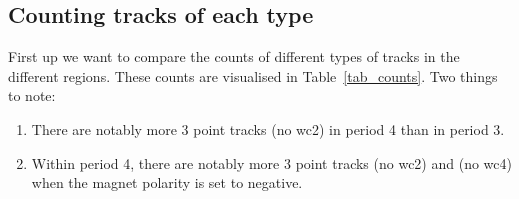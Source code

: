   
  
    \newpage
  \subsection{Counting tracks of each type}
  
  First up we want to compare the counts of different types of tracks in the different regions. These counts are visualised in Table~\ref{tab_counts}. Two things to note:
  \begin{enumerate}
  \item There are notably more 3 point tracks (no wc2) in period 4 than in period 3.\\
  \item Within period 4, there are notably more 3 point tracks (no wc2) and (no wc4) when the magnet polarity is set to negative.
  \end{enumerate}
  
